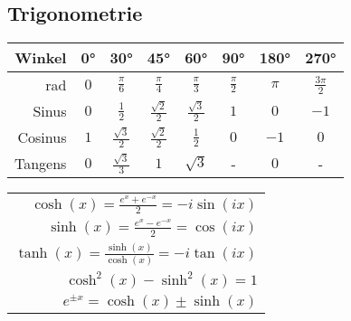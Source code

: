 \documentclass[a4paper,10pt]{scrartcl}
\begin{document}
\subsection{Trigonometrie}
\begin{tabular}{r | c c c c c c c}
	Winkel     &0°   &30°                    &45°                   &60°                   &90°              &180°   &270°               \\\hline 
	rad        &$0$  &$\frac{\pi}{6}$        &$\frac{\pi}{4}$       &$\frac{\pi}{3}$       &$\frac{\pi}{2}$  &$\pi$  &$\frac{3\pi}{2}$  \\\hline
	Sinus      &$0$  &$\frac{1}{2}$          &$\frac{\sqrt{2}}{2}$  &$\frac{\sqrt{3}}{2}$  &$1$              &$0$    &$-1$              \\
	Cosinus    &$1$  &$\frac{\sqrt{3}}{2}$   &$\frac{\sqrt{2}}{2}$  &$\frac{1}{2}$         &$0$              &$-1$   &$0$               \\
	Tangens    &$0$  &$\frac{\sqrt{3}}{3}$   &$1$                   &$\sqrt{3}$            &-                &$0$    &-                 \\
\end{tabular}
\renewcommand\arraystretch{1.4}
\begin{tabular}{r}
	$ \cosh(x) = \frac{e^x+e^{-x}}{2} = -i \sin(ix) $ \\
	$ \sinh(x) = \frac{e^x-e^{-x}}{2} = \cos(ix) $ \\
	$ \tanh(x) = \frac{\sinh(x)}{\cosh(x)} = -i\tan(ix) $ \\
	$ \cosh^2(x) - \sinh^2(x) = 1 $ \\
	$ e^{\pm x} = \cosh(x) \pm \sinh(x) $
\end{tabular}
\end{document}
